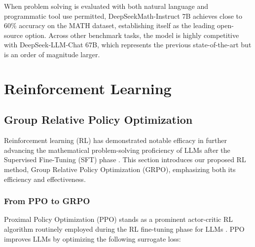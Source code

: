 When problem solving is evaluated with both natural language and programmatic tool use permitted, DeepSeekMath-Instruct 7B achieves close to 60\% accuracy on the MATH dataset, establishing itself as the leading open-source option. Across other benchmark tasks, the model is highly competitive with DeepSeek-LLM-Chat 67B, which represents the previous state-of-the-art but is an order of magnitude larger.

\section{Reinforcement Learning}

\subsection{Group Relative Policy Optimization} Reinforcement learning (RL) has demonstrated notable efficacy in further advancing the mathematical problem-solving proficiency of LLMs after the Supervised Fine-Tuning (SFT) phase \citep{wang2023math,wizardmath}. This section introduces our proposed RL method, Group Relative Policy Optimization (GRPO), emphasizing both its efficiency and effectiveness.

\subsubsection{From PPO to GRPO} Proximal Policy Optimization (PPO) \citep{schulman2017proximal} stands as a prominent actor-critic RL algorithm routinely employed during the RL fine-tuning phase for LLMs \citep{ouyang2022training}. PPO improves LLMs by optimizing the following surrogate loss:

